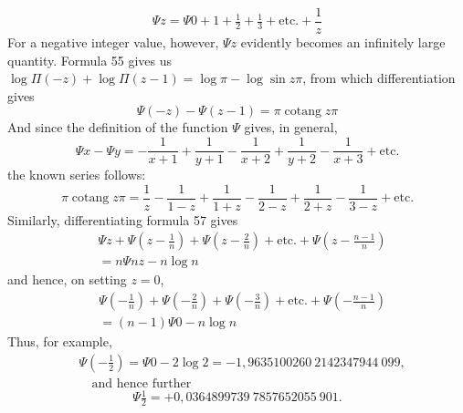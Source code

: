 \[
\Psi z=\Psi0+1+\tfrac12+\tfrac13+\text{etc.}+\frac1z\tag*{[67]}
\]
For a negative integer value, however, $\Psi z$ evidently becomes an infinitely large quantity.
Formula 55 gives us $\log\Pi(-z)+\log\Pi(z-1)=\log\pi-\log\sin z\pi$, from which differentiation gives
\[
\Psi(-z)-\Psi(z-1)=\pi\operatorname{cotang}z\pi\tag*{[68]}
\]
And since the definition of the function $\Psi$ gives, in general,
\[
\Psi x-\Psi y=-\frac1{x+1}+\frac1{y+1}-\frac1{x+2}+\frac1{y+2}-\frac1{x+3}+\text{etc.}\tag*{[69]}
\]
the known series follows:
\[
\pi\operatorname{cotang}z\pi=\frac1z-\frac1{1-z}+\frac1{1+z}-\frac1{2-z}+\frac1{2+z}-\frac1{3-z}+\text{etc.}
\]
Similarly, differentiating formula 57 gives
\[
\begin{aligned}
&\Psi z+\Psi\left(z-\frac1n\right)+\Psi\left(z-\frac2n\right)+\text{etc.}+\Psi\left(z-\frac{n-1}{n}\right)\\[4pt]
&=n\Psi nz-n\log n
\end{aligned}
\tag*{[70]}\]
and hence, on setting $z=0$,
\[
\begin{aligned}
&\Psi\left(-\frac1n\right)+\Psi\left(-\frac2n\right)+\Psi\left(-\frac3n\right)+\text{etc.}+\Psi\left(-\frac{n-1}{n}\right)\\[4pt]
&=(n-1)\Psi0-n\log n
\end{aligned}
\tag*{[71]}\]
Thus, for example,
\[
\begin{aligned}
&\Psi\left(-\tfrac12\right)=\Psi0-2\log2=-1{,}9635100260\ 2142347944\ 099,\\[4pt]
&\quad\text{and hence further}
\end{aligned}
\]
\[
\Psi\tfrac12=+0{,}0364899739\ 7857652055\ 901.
\]
